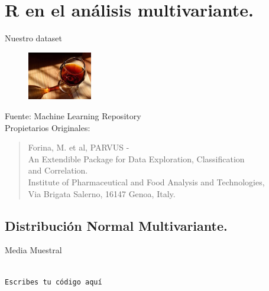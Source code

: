 \documentclass[xcolor=table]{beamer}
\begin{document}
\section{R en el análisis multivariante.}
\begin{frame}{Nuestro dataset}

\begin{table}[]
\end{table}
\begin{figure}
\centering
\includegraphics[width=0.25\textwidth]{vino.jpg}
\end{figure}
{Fuente: Machine Learning Repository\\
Propietarios Originales: }\begin{quote}\scriptsize Forina, M. et al, PARVUS -\\
An Extendible Package for Data Exploration, Classification \\and Correlation.\\
Institute of Pharmaceutical and Food Analysis and Technologies, \\Via Brigata Salerno,
16147 Genoa, Italy.\end{quote}
\end{frame}
\subsection{Distribución Normal Multivariante.}
\begin{frame}{Media Muestral}
\begin{verbatim}

Escribes tu código aquí­

\end{verbatim}
\end{frame}
\end{document}
